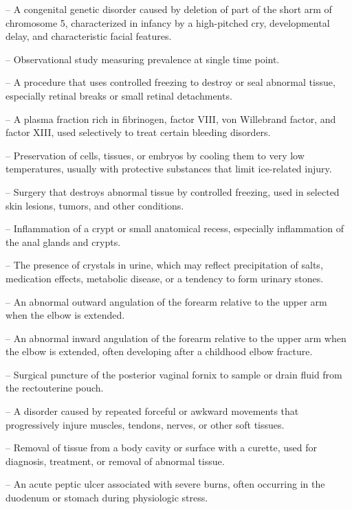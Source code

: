 -- A congenital genetic disorder caused by deletion of part of the short arm of chromosome 5, characterized in infancy by a high-pitched cry, developmental delay, and characteristic facial features.

-- Observational study measuring prevalence at single time point.

-- A procedure that uses controlled freezing to destroy or seal abnormal tissue, especially retinal breaks or small retinal detachments.

-- A plasma fraction rich in fibrinogen, factor VIII, von Willebrand factor, and factor XIII, used selectively to treat certain bleeding disorders.

-- Preservation of cells, tissues, or embryos by cooling them to very low temperatures, usually with protective substances that limit ice-related injury.

-- Surgery that destroys abnormal tissue by controlled freezing, used in selected skin lesions, tumors, and other conditions.

-- Inflammation of a crypt or small anatomical recess, especially inflammation of the anal glands and crypts.

-- The presence of crystals in urine, which may reflect precipitation of salts, medication effects, metabolic disease, or a tendency to form urinary stones.

-- An abnormal outward angulation of the forearm relative to the upper arm when the elbow is extended.

-- An abnormal inward angulation of the forearm relative to the upper arm when the elbow is extended, often developing after a childhood elbow fracture.

-- Surgical puncture of the posterior vaginal fornix to sample or drain fluid from the rectouterine pouch.

-- A disorder caused by repeated forceful or awkward movements that progressively injure muscles, tendons, nerves, or other soft tissues.

-- Removal of tissue from a body cavity or surface with a curette, used for diagnosis, treatment, or removal of abnormal tissue.

-- An acute peptic ulcer associated with severe burns, often occurring in the duodenum or stomach during physiologic stress.


